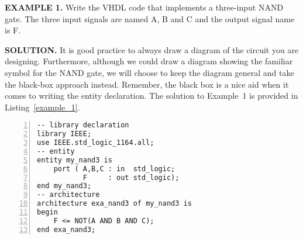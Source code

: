 \begin{leftbar}
\noindent
\textbf{EXAMPLE 1.}
Write the VHDL code that implements a three-input NAND gate. The three input signals are named A, B and C and the output signal name is F. 
\end{leftbar}
\noindent
\textbf{SOLUTION.} It is good practice to always draw a diagram of the circuit you are designing. Furthermore, although we could draw a diagram showing the familiar symbol for the NAND gate, we will choose to keep the diagram general and take the black-box approach instead. Remember, the black box is a nice aid when it comes to writing the entity declaration. The solution to Example~1 is provided in Listing~\ref{example_1}.

\noindent
\begin{minipage}{0.55\linewidth}
\begin{lstlisting}[numbers=left,label=example_1, caption=Solution of Example~1.]
-- library declaration
library IEEE;
use IEEE.std_logic_1164.all;
-- entity
entity my_nand3 is
	port ( A,B,C : in  std_logic;
	       F     : out std_logic);
end my_nand3;
-- architecture
architecture exa_nand3 of my_nand3 is
begin
	F <= NOT(A AND B AND C);
end exa_nand3;
\end{lstlisting}
\end{minipage}
\begin{minipage}{0.4\linewidth}
\begin{flushright}
\end{flushright}
\end{minipage}

